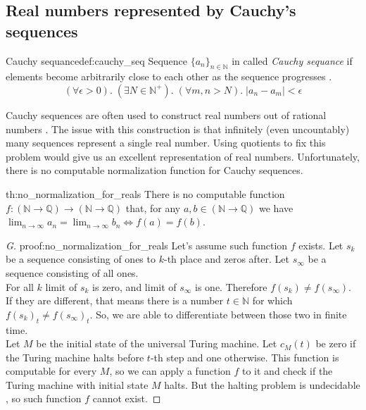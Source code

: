 \subsection{Real numbers represented by Cauchy’s sequences}
\begin{defi}{Cauchy sequance}{def:cauchy_seq}
Sequence $\{a_n\}_{n\in \mathbb{N}}$ in called \emph{Cauchy sequance} if elements become arbitrarily close to each other as the sequence progresses \cite{Anal}.
$$
    (\forall \epsilon > 0). \; (\exists N \in \mathbb{N}^+). \; (\forall m, n > N). \; |a_n - a_m| < \epsilon
$$
\end{defi}
Cauchy sequences are often used to construct real numbers out of rational numbers \cite{CauchyReals}. The issue with this construction is that infinitely (even uncountably) many sequences represent a single real number. Using quotients to fix this problem would give us an excellent representation of real numbers. Unfortunately, there is no computable normalization function for Cauchy sequences.

\begin{theo}{}{th:no_normalization_for_reals}
There is no computable function $f: (\mathbb{N} \rightarrow \mathbb{Q}) \rightarrow (\mathbb{N} \rightarrow \mathbb{Q})$ that, for any $a, b \in (\mathbb{N} \rightarrow \mathbb{Q})$ we have $\lim_{n \rightarrow \infty}a_n = \lim_{n \rightarrow \infty}b_n \iff f(a) = f(b)$.
\end{theo}

\begin{proof}[G]{}{proof:no_normalization_for_reals}
Let's assume such function $f$ exists.
Let $s_k$ be a sequence consisting of ones to $k$-th place and zeros after. Let $s_\infty$ be a sequence consisting of all ones. \\For all $k$ limit of $s_k$ is zero, and limit of $s_\infty$ is one. Therefore $f(s_k)  \neq f(s_\infty)$. If they are different, that means there is a number $t \in \mathbb{N}$ for which $f(s_k)_t  \neq f(s_\infty)_t$. So, we are able to differentiate between those two in finite time.\\
Let $M$ be the initial state of the universal Turing machine. Let $c_M(t)$ be zero if the Turing machine halts before $t$-th step and one otherwise. This function is computable for every $M$, so we can apply a function $f$ to it and check if the Turing machine with initial state $M$ halts. But the halting problem is undecidable \cite{Undecidable}, so such function $f$ cannot exist. \contradiction
\end{proof}

